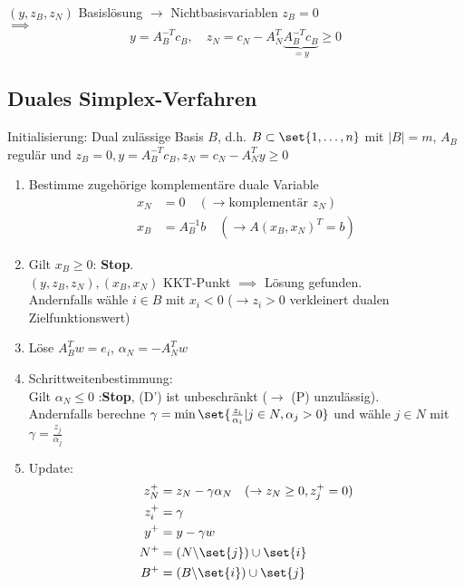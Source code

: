 $(y,z_{B},z_{N})$ Basislösung $\to$ Nichtbasisvariablen $z_{B} =0$ \\
$\implies$
\begin{equation*}
	y = A_{B}^{-T}c_{B}, \quad z_{N}= c_{N}- A_{N}^{T} \underbrace{A_{B}^{-T}c_{B}}_{{=y}}\geq 0
\end{equation*}
\subsection{Duales Simplex-Verfahren}
Initialisierung: Dual zulässige Basis $B$, d.h. $B \subset \set{1,\dots ,n }$ mit $|B|=m$, $A_{B}$ regulär und $z_{B}=0,y=A_{B}^{-T}c_{B}, z_{N}= c_{N}-A_{N}^{T}y \geq 0$
\begin{enumerate}%
	\item Bestimme zugehörige komplementäre duale Variable
		\begin{align*}
			x_{N}&=0 \quad (\to \text{komplementär }z_{N})\\
			x_{B}&= A_{B}^{-1} b\quad ( \to A(x_{B},x_{N})^{T} =b)
		\end{align*}
	\item Gilt $x_{B} \geq 0 $: \textbf{Stop}.\\
		$(y,z_{B},z_{N}),(x_{B},x_{N})$ KKT-Punkt $\implies$ Lösung gefunden.\\
		Andernfalls wähle $ i \in B$ mit $x_{i}<0$ ($\to z_{i}>0$ verkleinert dualen Zielfunktionswert)
	\item Löse $A_{B}^{T} w = e_{i}$, $\alpha_{N} = -A_{N}^{T} w$
	\item Schrittweitenbestimmung:\\
		Gilt $\alpha_{N} \leq 0 $ :\textbf{Stop}, (D') ist unbeschränkt ($\to$ (P) unzulässig).\\
		Andernfalls berechne $\gamma = \min \set{ \frac{z_{i}}{\alpha_{i}}|j \in N , \alpha_{j} >0 }$ und wähle $j \in N$ mit $\gamma = \frac{z_{j}}{\alpha_{j}}$
	\item Update:
		\begin{align*}
			z_{N}^+ &= z_{N} - \gamma \alpha_{N} \quad (\to z_{N} \geq 0, z_{j}^+ =0)\\
			z_{i}^+ &= \gamma\\
			y^+ &= y -\gamma w\\
			N^+ &= (N \backslash \set{ j }) \cup \set{ i }\\
			B^+ &= (B \backslash \set{ i }) \cup \set{ j }
		\end{align*}
\end{enumerate}

